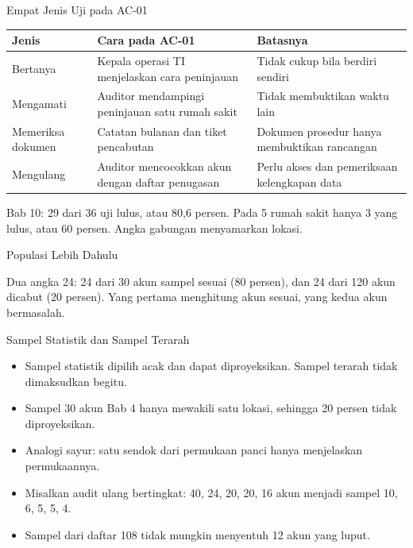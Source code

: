 \documentclass[aspectratio=169, table, 12pt]{beamer}
\begin{document}
\begin{frame}{{\Large Empat Jenis Uji pada AC-01}}
  \vspace{4pt}
  \scriptsize
  \begin{tabularx}{\textwidth}{|>{\raggedright\arraybackslash}p{}|>{\raggedright\arraybackslash}X|>{\raggedright\arraybackslash}X|}
    \hline
    \textbf{Jenis} & \textbf{Cara pada AC-01} & \textbf{Batasnya} \\ \hline
    Bertanya & Kepala operasi TI menjelaskan cara peninjauan & Tidak cukup bila berdiri sendiri \\
    \hline
    Mengamati & Auditor mendampingi peninjauan satu rumah sakit & Tidak membuktikan waktu lain \\
    \hline
    Memeriksa dokumen & Catatan bulanan dan tiket pencabutan & Dokumen prosedur hanya membuktikan
    rancangan \\ \hline
    Mengulang & Auditor mencocokkan akun dengan daftar penugasan & Perlu akses dan pemeriksaan
    kelengkapan data \\ \hline
  \end{tabularx}

  \vspace{8pt}
  \small Bab 10: 29 dari 36 uji lulus, atau 80,6 persen. Pada 5 rumah sakit hanya 3 yang lulus, atau
  60 persen. Angka gabungan menyamarkan lokasi.
\end{frame}

\begin{frame}{{\Large Populasi Lebih Dahulu}}
  \vspace{4pt}
  \begin{center}
    \resizebox{0.9\textwidth}{!}{}
  \end{center}
  \vspace{2pt}
  \scriptsize Dua angka 24: 24 dari 30 akun sampel sesuai (80 persen), dan 24 dari 120 akun dicabut
  (20 persen). Yang pertama menghitung akun sesuai, yang kedua akun bermasalah.
\end{frame}

\begin{frame}{{\Large Sampel Statistik dan Sampel Terarah}}
  \vspace{6pt}
  \small
  \begin{itemize}
    \item Sampel statistik dipilih acak dan dapat diproyeksikan. Sampel terarah tidak dimaksudkan
          begitu.
    \item Sampel 30 akun Bab 4 hanya mewakili satu lokasi, sehingga 20 persen tidak diproyeksikan.
    \item Analogi sayur: satu sendok dari permukaan panci hanya menjelaskan permukaannya.
    \item Misalkan audit ulang bertingkat: 40, 24, 20, 20, 16 akun menjadi sampel 10, 6, 5, 5, 4.
    \item Sampel dari daftar 108 tidak mungkin menyentuh 12 akun yang luput.
  \end{itemize}
\end{frame}
\end{document}
